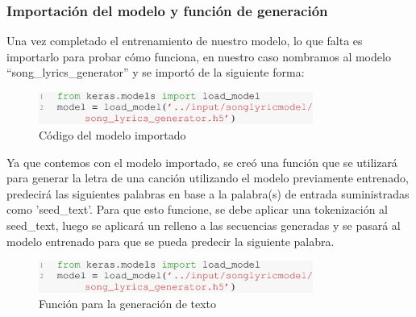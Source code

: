 \subsubsection{Importación del modelo y función de generación}
Una vez completado el entrenamiento de nuestro modelo, lo que falta es importarlo para probar cómo funciona, en nuestro caso nombramos al modelo “song\_lyrics\_generator” y se importó de la siguiente forma:
\begin{figure}[h]
	\centering
	\includegraphics[width=9cm]{figuras/Import.png}
	\caption{Código del modelo importado}
	\label{fig:Código del modelo importado}
\end{figure}
Ya que contemos con el modelo importado, se creó una función que se utilizará para generar la letra de una canción utilizando el modelo previamente entrenado, predecirá las siguientes palabras en base a la palabra(s) de entrada suministradas como 'seed\_text'. Para que esto funcione, se debe aplicar una tokenización al seed\_text, luego se aplicará un relleno a las secuencias generadas y se pasará al modelo entrenado para que se pueda predecir la siguiente palabra.

\begin{figure}[h]
	\centering
	\includegraphics[width=9cm]{figuras/Import.png}
	\caption{Función para la generación de texto}
	\label{fig:Función generación de texto}
\end{figure}
